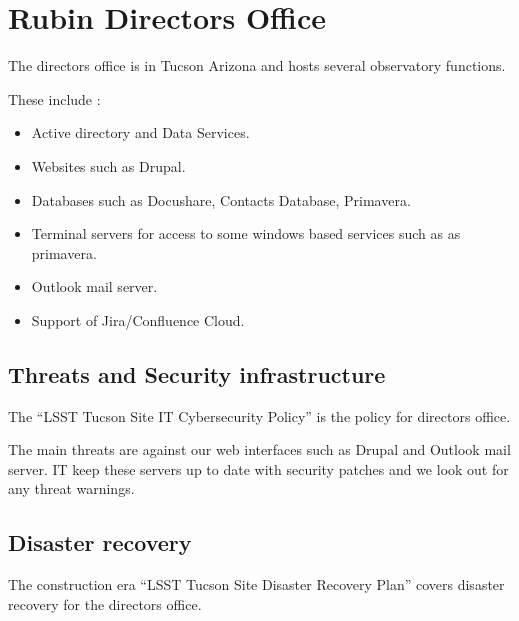 \section{Rubin Directors Office} \label{sec:rdo}

The directors office is in Tucson Arizona and hosts several observatory functions.

These include :

\begin{itemize}
\item Active directory and Data Services.
\item Websites such as Drupal.
\item Databases such as Docushare, Contacts Database, Primavera.
\item Terminal servers for access to some windows based services such as as primavera.
\item Outlook mail server.
\item Support of Jira/Confluence Cloud.
\end{itemize}

\subsection{Threats and Security infrastructure}
The ``LSST Tucson Site IT Cybersecurity Policy''  is the policy for directors office.

The main threats are against our web interfaces such as Drupal and Outlook mail server.
IT keep these servers up to date with security patches and we look out for any threat warnings.


\subsection {Disaster recovery}
The construction era  ``LSST Tucson Site Disaster Recovery Plan''  covers disaster recovery for the directors office.
